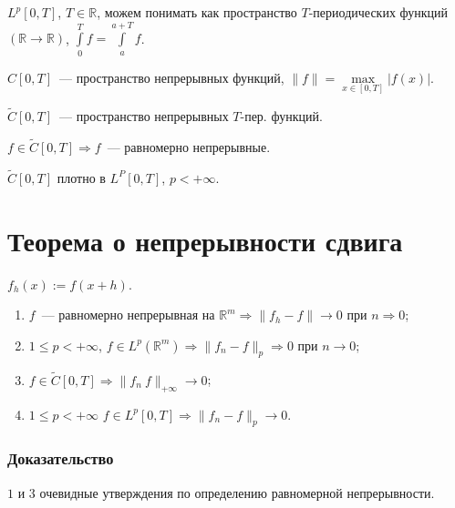\documentclass{article}
\begin{document}
    \newpage
    
    $L^p [0, T]$, $T \in \mathbb{R}$, можем понимать как пространство $T$-периодических функций $\left( \mathbb{R} \rightarrow \mathbb{R} \right)$, $\int\limits^T_0 f = \int\limits^{a + T}_a f$.
    
    $C [0, T]$~--- пространство непрерывных функций, $\| f \| = \max\limits_{x \in [0, T]} | f(x) |$.
    
    $\widetilde{C} [0, T]$~--- пространство непрерывных $T$-пер. функций.
        
    $f \in \widetilde{C} [0, T] \Rightarrow f$~--- равномерно непрерывные.
    
    $\widetilde{C} [0, T]$ плотно в $L^P [0, T]$, $p < +\infty$.
    
    \newpage
    
    \section{Теорема о непрерывности сдвига}
    
        $f_h(x) := f(x + h)$.
        
        \begin{enumerate}
        
            \item $f$~--- равномерно непрерывная на $\mathbb{R}^m \Rightarrow \| f_h - f \| \rightarrow 0$ при $n \Rightarrow 0$;
            
            \item $1 \leqslant p < +\infty$, $f \in L^p \left( \mathbb{R}^m \right) \Rightarrow \| f_n - f \|_p \Rightarrow 0$ при $n \rightarrow 0$;
            
            \item $f \in \widetilde{C} [0, T] \Rightarrow \| f_n \ f \|_{+\infty} \rightarrow 0$;
            
            \item $1 \leqslant p < +\infty$ $f \in L^p [0, T] \Rightarrow \| f_n - f \|_p \rightarrow 0$.
            
        \end{enumerate}
        
        \subsubsection{Доказательство}
        
            $1$ и $3$ очевидные утверждения по определению равномерной непрерывности.
            
\end{document}
